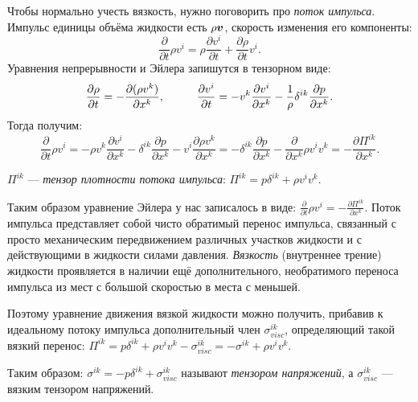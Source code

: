 Чтобы нормально учесть вязкость, нужно поговорить про \textit{поток импульса}.
Импульс единицы объёма жидкости есть $\rho \mbox{\boldmath $v$}$, скорость изменения его компоненты:
\begin{equation*}
	\frac{\partial}{\partial t} \rho v^i = \rho \frac{\partial v^i}{\partial t} + \frac{\partial \rho}{\partial t} v^i.
\end{equation*}
Уравнения непрерывности и Эйлера запишутся в тензорном виде:
\begin{equation*}
	\frac{\partial \rho}{\partial t} = - \frac{\partial (\rho v^k)}{\partial x^k},
	\hspace*{0.5 cm}
	\hspace*{0.5 cm}
	\frac{\partial v^i}{\partial t} = - v^k \frac{\partial v^i}{\partial x^k} - \frac{1}{\rho} \delta^{i k} \frac{\partial p}{\partial x^k}.
\end{equation*}
Тогда получим:
\begin{equation*}
	\frac{\partial}{\partial t} \rho v^i 
	= 
	- \rho v^k \frac{\partial v^i}{\partial x^k} -  \delta^{i k} \frac{\partial p}{\partial x^k} - v^i \frac{\partial \rho v^k}{\partial x^k} 
	=
	-\delta^{i k} \frac{\partial p}{\partial x^k} - \frac{\partial}{\partial x^k} \rho v^i v^k
	= - \frac{\partial \Pi^{i k}}{\partial x^k}.
\end{equation*}
\begin{to_def}
	$\Pi^{i k} $ --- \textit{тензор плотности потока импульса}:
	$
		\Pi^{i k} = p \delta^{i k} + \rho v^i v^k.
	$
\end{to_def}

Таким образом уравнение Эйлера у нас записалось в виде:
$
	\frac{\partial}{\partial t} \rho v^i = - \frac{\partial \Pi^{i k}}{\partial x^k}.
$
Поток импульса представляет собой чисто обратимый перенос импульса, связанный с просто механическим передвижением различных участков жидкости и с действующими в жидкости силами давления.
\textit{Вязкость} (внутреннее трение) жидкости проявляется в наличии ещё дополнительного, необратимого переноса импульса из мест с большой скоростью в места с меньшей.

Поэтому уравнение движения вязкой жидкости можно получить, прибавив к идеальному потоку импульса дополнительный член $\sigma^{i k}_{visc}$, определяющий такой вязкий перенос:
$
\Pi^{i k} = p \delta^{i k} + \rho v^i v^k - \sigma^{i k}_{visc} = - \sigma^{i k} + \rho v^i v^k.
$
\begin{to_def}
	Таким образом: $\sigma^{i k} = - p \delta^{i k} + \sigma^{i k}_{visc}$ называют \textit{тензором напряжений}, а $\sigma^{i k}_{visc}$ --- вязким тензором напряжений.
\end{to_def}

